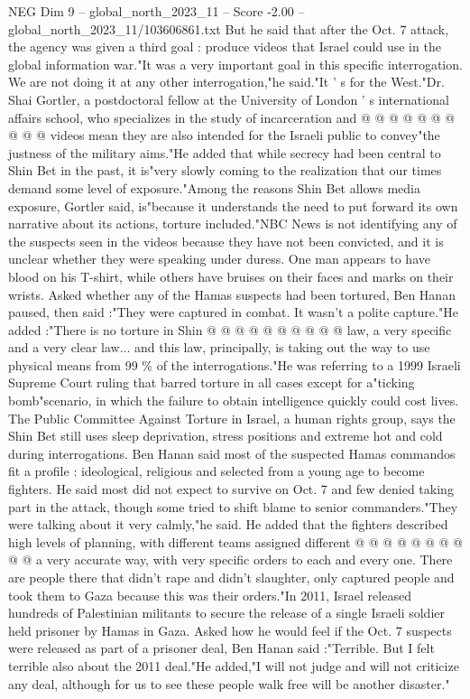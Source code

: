 \begin{textsample}{NEG Dim 9 – global\_north\_2023\_11 – Score -2.00 – global\_north\_2023\_11/103606861.txt}
But he said that after the Oct. 7 attack, the agency was given a third goal : produce videos that Israel could use in the global information war."It was a very important goal in this specific interrogation.
We are not doing it at any other interrogation,"he said."It ' s for the West."Dr.
Shai Gortler, a postdoctoral fellow at the University of London ' s international affairs school, who specializes in the study of incarceration and @ @ @ @ @ @ @ @ @ @ videos mean they are also intended for the Israeli public to convey"the justness of the military aims."He added that while secrecy had been central to Shin Bet in the past, it is"very slowly coming to the realization that our times demand some level of exposure."Among the reasons Shin Bet allows media exposure, Gortler said, is"because it understands the need to put forward its own narrative about its actions, torture included."NBC News is not identifying any of the suspects seen in the videos because they have not been convicted, and it is unclear whether they were speaking under duress.
One man appears to have blood on his T-shirt, while others have bruises on their faces and marks on their wrists.
Asked whether any of the Hamas suspects had been tortured, Ben Hanan paused, then said :"They were captured in combat.
It wasn't a polite capture."He added :"There is no torture in Shin @ @ @ @ @ @ @ @ @ @ law, a very specific and a very clear law... and this law, principally, is taking out the way to use physical means from 99 \% of the interrogations."He was referring to a 1999 Israeli Supreme Court ruling that barred torture in all cases except for a"ticking bomb"scenario, in which the failure to obtain intelligence quickly could cost lives.
The Public Committee Against Torture in Israel, a human rights group, says the Shin Bet still uses sleep deprivation, stress positions and extreme hot and cold during interrogations.
Ben Hanan said most of the suspected Hamas commandos fit a profile : ideological, religious and selected from a young age to become fighters.
He said most did not expect to survive on Oct. 7 and few denied taking part in the attack, though some tried to shift blame to senior commanders."They were talking about it very calmly,"he said.
He added that the fighters described high levels of planning, with different teams assigned different @ @ @ @ @ @ @ @ @ @ a very accurate way, with very specific orders to each and every one.
There are people there that didn't rape and didn't slaughter, only captured people and took them to Gaza because this was their orders."In 2011, Israel released hundreds of Palestinian militants to secure the release of a single Israeli soldier held prisoner by Hamas in Gaza.
Asked how he would feel if the Oct. 7 suspects were released as part of a prisoner deal, Ben Hanan said :"Terrible.
But I felt terrible also about the 2011 deal."He added,"I will not judge and will not criticize any deal, although for us to see these people walk free will be another disaster."

\end{textsample}
